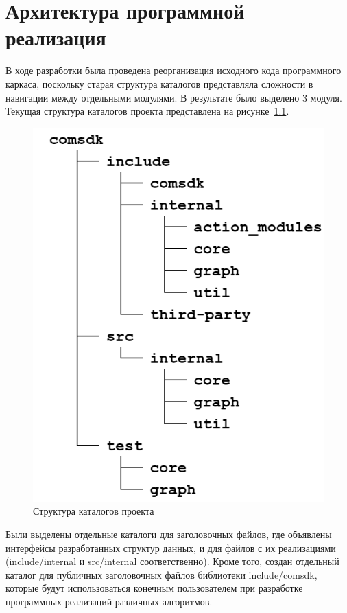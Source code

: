 \chapter{Архитектура программной реализация}\label{chap3_soft_architecture}
В ходе разработки была проведена реорганизация исходного кода программного каркаса, поскольку старая структура каталогов представляла сложности в навигации между отдельными модулями. В результате было выделено 3 модуля. Текущая структура каталогов проекта представлена на рисунке~\ref{fig:fileStructure}.

\begin{figure}[!ht]
    \centering
    \includegraphics[height=0.35\textheight]{figures/fileStructure.png}
    \caption{Структура каталогов проекта}
    \label{fig:fileStructure}
\end{figure}

Были выделены отдельные каталоги для заголовочных файлов, где объявлены интерфейсы разработанных структур данных, и для файлов с их реализациями (\textsf{include/internal} и \textsf{src/internal} соответственно). Кроме того, создан отдельный каталог для публичных заголовочных файлов библиотеки \textsf{include/comsdk}, которые будут использоваться конечным пользователем при разработке программных реализаций различных алгоритмов.

